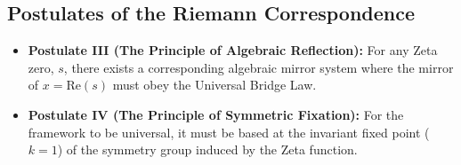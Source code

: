 \documentclass{article}
\begin{document}
\subsection{Postulates of the Riemann Correspondence}
\begin{itemize}
    \item \textbf{Postulate III (The Principle of Algebraic Reflection):} For any Zeta zero, $s$, there exists a corresponding algebraic mirror system where the mirror of $x=\text{Re}(s)$ must obey the Universal Bridge Law.
    
    \item \textbf{Postulate IV (The Principle of Symmetric Fixation):} For the framework to be universal, it must be based at the invariant fixed point ($k=1$) of the symmetry group induced by the Zeta function.
\end{itemize}
\end{document}
